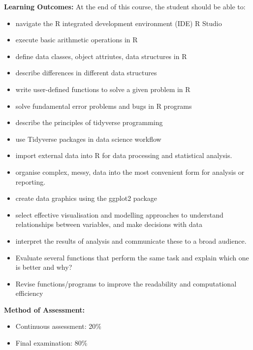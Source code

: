 \documentclass[a4paper,12pt]{article}
\begin{document}
\newpage

\noindent\textbf{Learning Outcomes:}
At the end of this course, the student should be able to:
\begin{itemize}
	\setlength\itemsep{0.1mm}
\item navigate the R integrated development environment (IDE) R Studio
\item execute basic arithmetic operations in R
\item define data classes, object attriutes, data structures in R
\item describe differences in different data structures
\item write user-defined functions  to solve a given problem in R 
\item solve fundamental error problems and bugs in R programs
\item describe the principles of tidyverse programming
\item use Tidyverse packages in data science workflow 
\item import external data into R for data processing and statistical analysis.
\item organise complex, messy, data into the most convenient form for analysis or reporting.
\item create data graphics using the ggplot2 package
\item select effective visualisation and modelling approaches to understand relationships between variables, and make decisions with data
\item interpret the results of analysis and communicate these to a broad audience.
\item Evaluate several functions that perform the same task and explain which one is better and why?
\item Revise functions/programs to improve the readability and computational efficiency

\end{itemize}

\noindent\textbf{Method of Assessment:}
\begin{itemize}
	\setlength\itemsep{0.1mm}
	\item Continuous assessment: 20\%
	\item Final examination: 80\%
\end{itemize}
\end{document}
